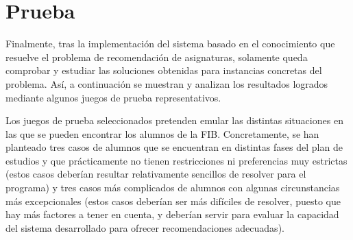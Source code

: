 
\section{Prueba} \label{sec:prueba}

Finalmente, tras la implementación del sistema basado en el conocimiento que 
resuelve el problema de recomendación de asignaturas, solamente queda 
comprobar y estudiar las soluciones obtenidas para instancias concretas del 
problema. Así, a continuación se muestran y analizan los resultados logrados 
mediante algunos juegos de prueba representativos.

Los juegos de prueba seleccionados pretenden emular las distintas situaciones 
en las que se pueden encontrar los alumnos de la FIB. Concretamente, se han 
planteado tres casos de alumnos que se encuentran en distintas fases del plan 
de estudios y que prácticamente no tienen restricciones ni preferencias muy 
estrictas (estos casos deberían resultar relativamente sencillos de resolver 
para el programa) y tres casos más complicados de alumnos con algunas 
circunstancias más excepcionales (estos casos deberían ser más difíciles de 
resolver, puesto que hay más factores a tener en cuenta, y deberían servir 
para evaluar la capacidad del sistema desarrollado para ofrecer 
recomendaciones adecuadas).














\clearpage

